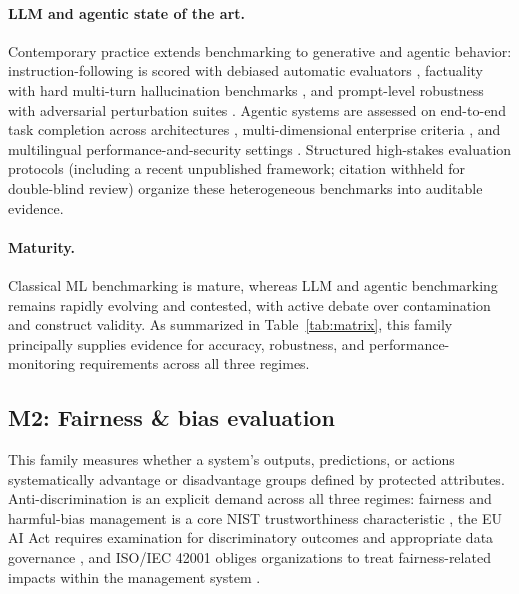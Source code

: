 \paragraph{LLM and agentic state of the art.} Contemporary practice extends benchmarking to generative and agentic behavior: instruction-following is scored with debiased automatic evaluators \cite{dubois2024alpacaeval}, factuality with hard multi-turn hallucination benchmarks \cite{hendrycks2024haulaeval}, and prompt-level robustness with adversarial perturbation suites \cite{dong2023promptrobust}. Agentic systems are assessed on end-to-end task completion across architectures \cite{anil2024agentarch}, multi-dimensional enterprise criteria \cite{song2025multidimensional}, and multilingual performance-and-security settings \cite{wang2023maps}. Structured high-stakes evaluation protocols (including a recent unpublished framework; citation withheld for double-blind review) organize these heterogeneous benchmarks into auditable evidence.

\paragraph{Maturity.} Classical ML benchmarking is mature, whereas LLM and agentic benchmarking remains rapidly evolving and contested, with active debate over contamination and construct validity. As summarized in Table~\ref{tab:matrix}, this family principally supplies evidence for accuracy, robustness, and performance-monitoring requirements across all three regimes.

\subsection{M2: Fairness \& bias evaluation}

This family measures whether a system's outputs, predictions, or actions systematically advantage or disadvantage groups defined by protected attributes. Anti-discrimination is an explicit demand across all three regimes: fairness and harmful-bias management is a core NIST trustworthiness characteristic \cite{nist2023airmf}, the EU AI Act requires examination for discriminatory outcomes and appropriate data governance \cite{euaiact2024}, and ISO/IEC 42001 obliges organizations to treat fairness-related impacts within the management system \cite{iso42001}.

